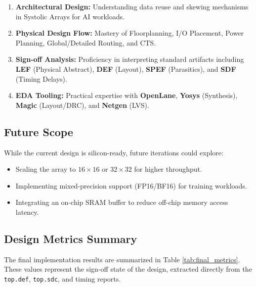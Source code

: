 \documentclass[12pt,a4paper]{article}
\begin{document}
\begin{enumerate}
    \item \textbf{Architectural Design:} Understanding data reuse and skewing mechanisms in Systolic Arrays for AI workloads.
    \item \textbf{Physical Design Flow:} Mastery of Floorplanning, I/O Placement, Power Planning, Global/Detailed Routing, and CTS.
    \item \textbf{Sign-off Analysis:} Proficiency in interpreting standard artifacts including \textbf{LEF} (Physical Abstract), \textbf{DEF} (Layout), \textbf{SPEF} (Parasitics), and \textbf{SDF} (Timing Delays).
    \item \textbf{EDA Tooling:} Practical expertise with \textbf{OpenLane}, \textbf{Yosys} (Synthesis), \textbf{Magic} (Layout/DRC), and \textbf{Netgen} (LVS).
\end{enumerate}

\subsection{Future Scope}

While the current design is silicon-ready, future iterations could explore:
\begin{itemize}
    \item Scaling the array to $16 \times 16$ or $32 \times 32$ for higher throughput.
    \item Implementing mixed-precision support (FP16/BF16) for training workloads.
    \item Integrating an on-chip SRAM buffer to reduce off-chip memory access latency.
\end{itemize}
\newpage

\subsection{Design Metrics Summary}

The final implementation results are summarized in Table \ref{tab:final_metrics}. These values represent the sign-off state of the design, extracted directly from the \texttt{top.def}, \texttt{top.sdc}, and timing reports.
\end{document}
